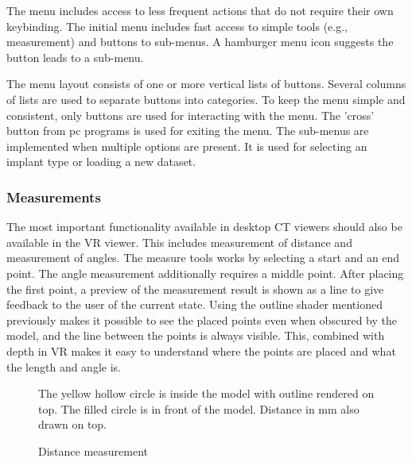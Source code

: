 \documentclass[a4paper]{report}
\begin{document}
The menu includes access to less frequent actions that do not require their own keybinding. The initial menu includes fast access to simple tools (e.g., measurement) and buttons to sub-menus. A hamburger menu icon suggests the button leads to a sub-menu.

The menu layout consists of one or more vertical lists of buttons. Several columns of lists are used to separate buttons into categories. To keep the menu simple and consistent, only buttons are used for interacting with the menu. The 'cross' button from pc programs is used for exiting the menu.
The sub-menus are implemented when multiple options are present. It is used for selecting an implant type or loading a new dataset.

\subsubsection{Measurements}
The most important functionality available in desktop CT viewers should also be available in the VR viewer. This includes measurement of distance and measurement of angles.
The measure tools works by selecting a start and an end point. The angle measurement additionally requires a middle point.
After placing the first point, a preview of the measurement result is shown as a line to give feedback to the user of the current state.
Using the outline shader mentioned previously makes it possible to see the placed points even when obscured by the model, and the line between the points is always visible. This, combined with depth in VR makes it easy to understand where the points are placed and what the length and angle is.

\begin{figure}[h!]
    \centering
	\hfill
  \caption{Distance measurement}
  \small
  The yellow hollow circle is inside the model with outline rendered on top. The filled circle is in front of the model. Distance in mm also drawn on top.
~\cite{mishra_virtual_2019}
\end{figure}
\end{document}
